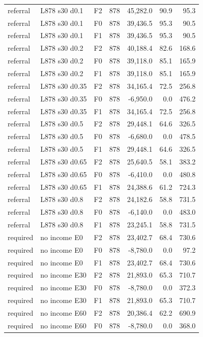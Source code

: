 \begin{longtable}{p{1.8cm}p{3.35cm}lrrrr}
referral & L878 s30 d0.1 & F2 & 878 & 45,282.0 & 90.9 & 95.3\\
referral & L878 s30 d0.1 & F0 & 878 & 39,436.5 & 95.3 & 90.5\\
referral & L878 s30 d0.1 & F1 & 878 & 39,436.5 & 95.3 & 90.5\\
referral & L878 s30 d0.2 & F2 & 878 & 40,188.4 & 82.6 & 168.6\\
referral & L878 s30 d0.2 & F0 & 878 & 39,118.0 & 85.1 & 165.9\\
referral & L878 s30 d0.2 & F1 & 878 & 39,118.0 & 85.1 & 165.9\\
referral & L878 s30 d0.35 & F2 & 878 & 34,165.4 & 72.5 & 256.8\\
referral & L878 s30 d0.35 & F0 & 878 & -6,950.0 & 0.0 & 476.2\\
referral & L878 s30 d0.35 & F1 & 878 & 34,165.4 & 72.5 & 256.8\\
referral & L878 s30 d0.5 & F2 & 878 & 29,448.1 & 64.6 & 326.5\\
referral & L878 s30 d0.5 & F0 & 878 & -6,680.0 & 0.0 & 478.5\\
referral & L878 s30 d0.5 & F1 & 878 & 29,448.1 & 64.6 & 326.5\\
referral & L878 s30 d0.65 & F2 & 878 & 25,640.5 & 58.1 & 383.2\\
referral & L878 s30 d0.65 & F0 & 878 & -6,410.0 & 0.0 & 480.8\\
referral & L878 s30 d0.65 & F1 & 878 & 24,388.6 & 61.2 & 724.3\\
referral & L878 s30 d0.8 & F2 & 878 & 24,182.6 & 58.8 & 731.5\\
referral & L878 s30 d0.8 & F0 & 878 & -6,140.0 & 0.0 & 483.0\\
referral & L878 s30 d0.8 & F1 & 878 & 23,245.1 & 58.8 & 731.5\\
required & no income E0 & F2 & 878 & 23,402.7 & 68.4 & 730.6\\
required & no income E0 & F0 & 878 & -8,780.0 & 0.0 & 97.2\\
required & no income E0 & F1 & 878 & 23,402.7 & 68.4 & 730.6\\
required & no income E30 & F2 & 878 & 21,893.0 & 65.3 & 710.7\\
required & no income E30 & F0 & 878 & -8,780.0 & 0.0 & 372.3\\
required & no income E30 & F1 & 878 & 21,893.0 & 65.3 & 710.7\\
required & no income E60 & F2 & 878 & 20,386.4 & 62.2 & 690.9\\
required & no income E60 & F0 & 878 & -8,780.0 & 0.0 & 368.0\\

\end{longtable}
